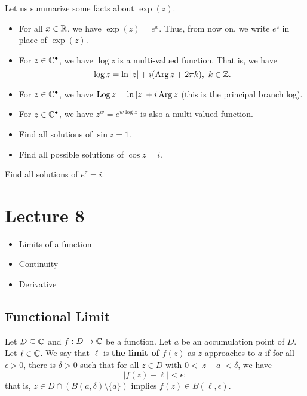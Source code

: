 \documentclass[a4paper]{report}
\begin{document}
Let us summarize some facts about \( \exp(z) \).

\begin{itemize}
    \item For all \( x \in \mathbb{R}  \), we have \( \exp(z) = e^{x} \). Thus, from now on, we write \( e^{z} \) in place of \( \exp(z) \).
    \item For \( z \in \mathbb{C}^{\bullet} \), we have \( \log z  \) is a multi-valued function. That is, we have 
        \[  \log z = \ln | z  |  + i (\operatorname{Arg} z + 2 \pi k ), \ k \in \mathbb{Z}.  \]
    \item For \( z \in \mathbb{C}^{\bullet} \), we have \( \operatorname{Log} z = \ln | z  |  + i \operatorname{Arg} z  \) (this is the principal branch log).
    \item For \( z \in \mathbb{C}^{\bullet} \), we have \( z^{w } = e^{w \log z} \) is also a multi-valued function.
\end{itemize}

\begin{eg}
    \begin{itemize}
        \item Find all solutions of \( \sin z = 1  \).
        \item Find all possible solutions of \( \cos z = i  \).
    \end{itemize}
\end{eg}

\begin{problem}
     Find all solutions of \( e^{z} = i  \).
\end{problem}
\begin{solution}

\end{solution}

\section{Lecture 8}

\begin{itemize}
    \item Limits of a function
    \item Continuity
    \item Derivative
\end{itemize}

\subsection{Functional Limit}\label{Functional Limit}

\begin{definition}
    Let \( D \subseteq \mathbb{C}   \) and \( f: D \to \mathbb{C}  \) be a function. Let \( a \) be an accumulation point of \( D  \). Let \( \ell \in \mathbb{C}  \). We say that \( \ell  \) is \textbf{the limit of \( f(z) \)} as \( z  \) approaches to \( a  \) if for all \( \epsilon > 0 \), there is \( \delta> 0  \) such that for all \( z \in D  \) with \( 0 < |  z - a  |  < \delta \), we have
    \[  | f(z) - \ell | < \epsilon; \]
    that is, \( z \in D \cap (B(a,\delta) \setminus  \{ a \} ) \) implies \( f(z) \in B(\ell, \epsilon) \).
\end{definition}
\end{document}
